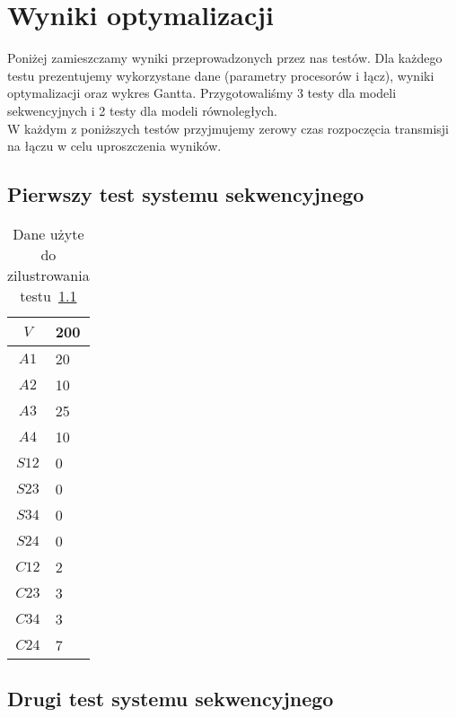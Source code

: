
\section{Wyniki optymalizacji}

Poniżej zamieszczamy wyniki przeprowadzonych przez nas testów.
Dla każdego testu prezentujemy wykorzystane dane (parametry procesorów i łącz),
wyniki optymalizacji oraz wykres Gantta.
Przygotowaliśmy 3 testy dla modeli sekwencyjnych i 2 testy dla modeli równoległych. \\

W każdym z poniższych testów przyjmujemy zerowy czas rozpoczęcia transmisji na łączu w celu uproszczenia wyników. \\



\subsection{Pierwszy test systemu sekwencyjnego} \label{test1}

\begin{table}[H]
\centering
\begin{tabular}{|c|l|}
\hline
$V$ & 200 \\ \hline
$A1$ & 20 \\ \hline
$A2$ & 10 \\ \hline
$A3$ & 25 \\ \hline
$A4$ & 10 \\ \hline
$S12$ & 0 \\ \hline
$S23$ & 0 \\ \hline
$S34$ & 0 \\ \hline
$S24$ & 0 \\ \hline
$C12$ & 2 \\ \hline
$C23$ & 3 \\ \hline
$C34$ & 3 \\ \hline
$C24$ & 7 \\ \hline
\end{tabular}
\caption{Dane użyte do zilustrowania testu~\ref{test1}}
\label{tab:res_1}
\end{table}

\subsection{Drugi test systemu sekwencyjnego} \label{test2}

